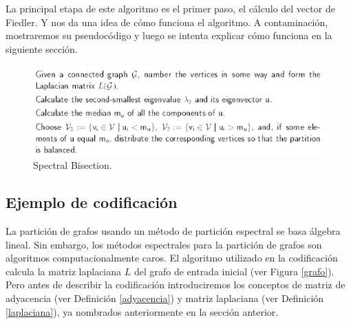 La principal etapa de este algoritmo es el primer paso, el cálculo del vector de Fiedler. Y nos da una idea de cómo funciona el algoritmo. A contaminación, mostraremos su pseudocódigo y luego se intenta explicar cómo funciona en la siguiente sección.

\begin{figure}[h]
	\centering
	\includegraphics[scale=0.8]{Figures/bisection_pseudocode}
	\vspace{1mm}
	\caption{Spectral Bisection.}
	\label{bisection_pseudocode}
\end{figure}

\subsection{Ejemplo de codificación}

La partición de grafos usando un método de partición espectral se basa álgebra lineal. Sin embargo, los métodos espectrales para la partición de grafos son algoritmos computacionalmente caros. El algoritmo utilizado en la codificación calcula la matriz laplaciana $L$ del grafo de entrada inicial (ver Figura \ref{grafo}). Pero antes de describir la codificación introduciremos los conceptos de matriz de adyacencia (ver Definición \ref{adyacencia}) y matriz laplaciana (ver Definición \ref{laplaciana}), ya nombrados anteriormente en la sección anterior.

